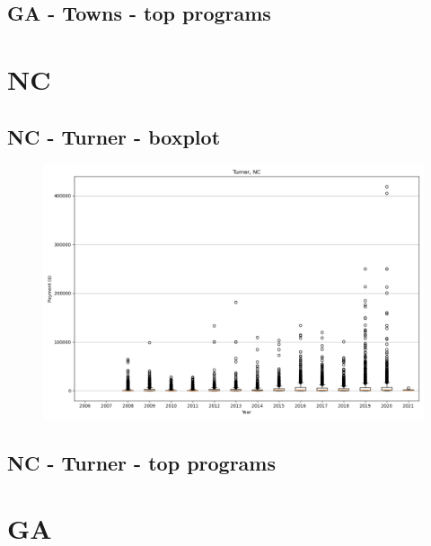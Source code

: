 \subsection*{GA - Towns - top programs}

\newpage
\section*{NC}
\subsection*{NC - Turner - boxplot}
\begin{figure}[h]
\centering
\includegraphics[width=7in]{../output/boxplots/counties/Turner-NC_boxplot.png}
\end{figure}


\subsection*{NC - Turner - top programs}

\newpage
\section*{GA}

